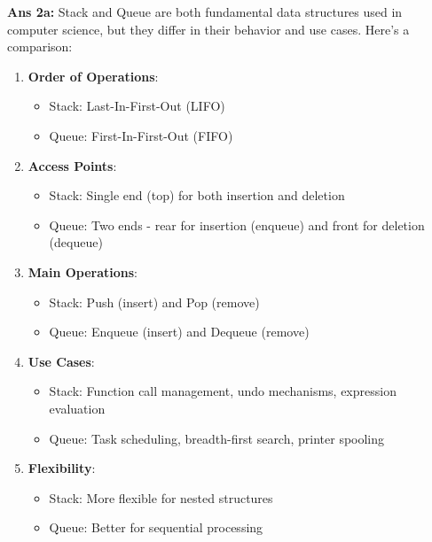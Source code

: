 \textbf{Ans 2a:} Stack and Queue are both fundamental data structures
used in computer science, but they differ in their behavior and use
cases. Here's a comparison:

\begin{enumerate}
\def\labelenumi{\arabic{enumi}.}
\tightlist
\item
  \textbf{Order of Operations}:

  \begin{itemize}
  \tightlist
  \item
    Stack: Last-In-First-Out (LIFO)
  \item
    Queue: First-In-First-Out (FIFO)
  \end{itemize}
\item
  \textbf{Access Points}:

  \begin{itemize}
  \tightlist
  \item
    Stack: Single end (top) for both insertion and deletion
  \item
    Queue: Two ends - rear for insertion (enqueue) and front for
    deletion (dequeue)
  \end{itemize}
\item
  \textbf{Main Operations}:

  \begin{itemize}
  \tightlist
  \item
    Stack: Push (insert) and Pop (remove)
  \item
    Queue: Enqueue (insert) and Dequeue (remove)
  \end{itemize}
\item
  \textbf{Use Cases}:

  \begin{itemize}
  \tightlist
  \item
    Stack: Function call management, undo mechanisms, expression
    evaluation
  \item
    Queue: Task scheduling, breadth-first search, printer spooling
  \end{itemize}
\item
  \textbf{Flexibility}:

  \begin{itemize}
  \tightlist
  \item
    Stack: More flexible for nested structures
  \item
    Queue: Better for sequential processing
  \end{itemize}
\end{enumerate}

